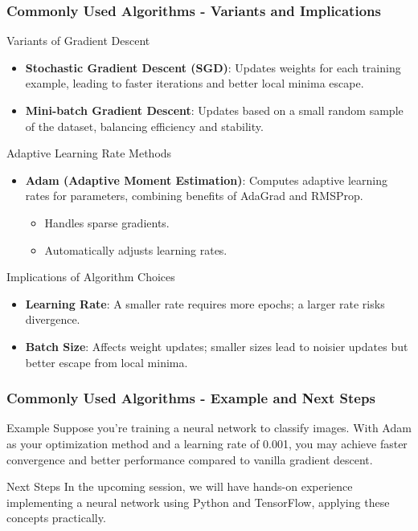 \documentclass[aspectratio=169]{beamer}
\begin{document}
\begin{frame}[fragile]
    \frametitle{Commonly Used Algorithms - Variants and Implications}
    \begin{block}{Variants of Gradient Descent}
        \begin{itemize}
            \item \textbf{Stochastic Gradient Descent (SGD)}: Updates weights for each training example, leading to faster iterations and better local minima escape.
            \item \textbf{Mini-batch Gradient Descent}: Updates based on a small random sample of the dataset, balancing efficiency and stability.
        \end{itemize}
    \end{block}
    
    \begin{block}{Adaptive Learning Rate Methods}
        \begin{itemize}
            \item \textbf{Adam (Adaptive Moment Estimation)}: Computes adaptive learning rates for parameters, combining benefits of AdaGrad and RMSProp.
            \begin{itemize}
                \item Handles sparse gradients.
                \item Automatically adjusts learning rates.
            \end{itemize}
        \end{itemize}
    \end{block}

    \begin{block}{Implications of Algorithm Choices}
        \begin{itemize}
            \item \textbf{Learning Rate}: A smaller rate requires more epochs; a larger rate risks divergence.
            \item \textbf{Batch Size}: Affects weight updates; smaller sizes lead to noisier updates but better escape from local minima.
        \end{itemize}
    \end{block}
\end{frame}

\begin{frame}[fragile]
    \frametitle{Commonly Used Algorithms - Example and Next Steps}
    \begin{block}{Example}
        Suppose you're training a neural network to classify images. With Adam as your optimization method and a learning rate of 0.001, you may achieve faster convergence and better performance compared to vanilla gradient descent.
    \end{block}

    \begin{block}{Next Steps}
        In the upcoming session, we will have hands-on experience implementing a neural network using Python and TensorFlow, applying these concepts practically.
    \end{block}
\end{frame}
\end{document}
